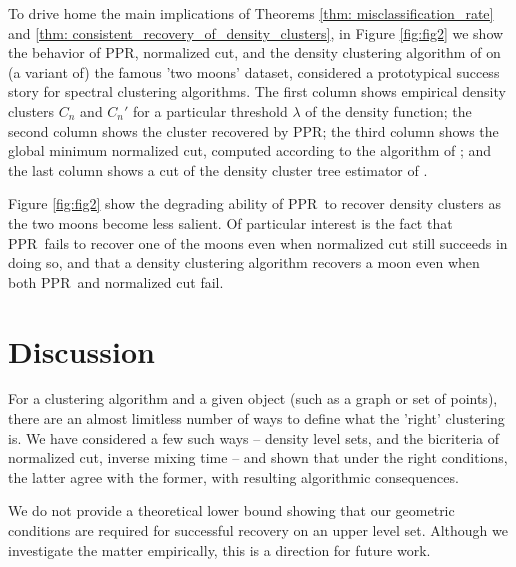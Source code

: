 \documentclass{article}
\newcommand{\1}{\mathbf{1}}
\newcommand{\ppr}{{\sc PPR}}
\newcommand{\pprspace}{{\sc PPR~}}
\theoremstyle{aldenthm}
\theoremstyle{aldenrmrk}
\begin{document}
To drive home the main implications of Theorems \ref{thm: misclassification_rate} and \ref{thm: consistent_recovery_of_density_clusters}, in Figure \ref{fig:fig2} we show the behavior of \ppr, normalized cut, and the density clustering algorithm of \citep{chaudhuri2010} on (a variant of) the famous 'two moons' dataset, considered a prototypical success story for spectral clustering algorithms. The first column shows empirical density clusters $C_n$ and $C_n'$ for a particular threshold $\lambda$ of the density function; the second column shows the cluster recovered by \ppr; the third column shows the global minimum normalized cut, computed according to the algorithm of \cite{szlam2010}; and the last column shows a cut of the density cluster tree estimator of \cite{chaudhuri2010}.

Figure \ref{fig:fig2} show the degrading ability of \pprspace to recover density clusters as the two moons become less salient. Of particular interest is the fact that \pprspace fails to recover one of the moons even when normalized cut still succeeds in doing so, and that a density clustering algorithm recovers a moon even when both \pprspace and normalized cut fail.

\section{Discussion}
\label{sec: discussion}
For a clustering algorithm and a given object (such as a graph or set of points), there are an almost limitless number of ways to define what the 'right' clustering is. We have considered a few such ways -- density level sets, and the bicriteria of normalized cut, inverse mixing time -- and shown that under the right conditions, the latter agree with the former, with resulting algorithmic consequences.

We do not provide a theoretical lower bound showing that our geometric conditions are required for successful recovery on an upper level set. Although we investigate the matter empirically, this is a direction for future work.

\clearpage



\end{document}
